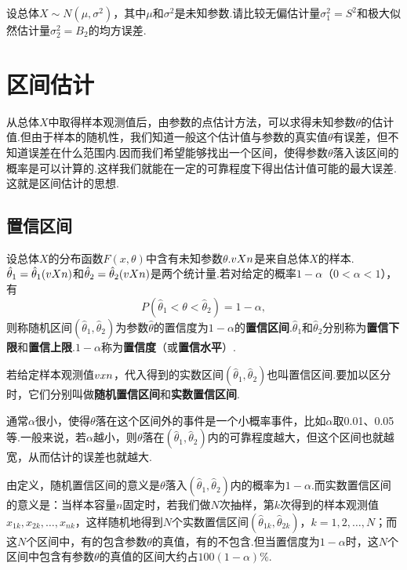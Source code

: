 \begin{example}
设总体\(X \sim N(\mu,\sigma^2)\)，其中\(\mu\)和\(\sigma^2\)是未知参数.请比较无偏估计量\(\sigma_1^2=S^2\)和极大似然估计量\(\sigma_2^2=B_2\)的均方误差.
\end{example}

\section{区间估计}
从总体\(X\)中取得样本观测值后，由参数的点估计方法，可以求得未知参数\(\theta\)的估计值.但由于样本的随机性，我们知道一般这个估计值与参数的真实值\(\theta\)有误差，但不知道误差在什么范围内.因而我们希望能够找出一个区间，使得参数\(\theta\)落入该区间的概率是可以计算的.这样我们就能在一定的可靠程度下得出估计值可能的最大误差.这就是区间估计的思想.

\subsection{置信区间}
\begin{definition}
设总体\(X\)的分布函数\(F(x,\theta)\)中含有未知参数\(\theta\).\(v{X}{n}\)是来自总体\(X\)的样本.\(\hat{\theta}_1=\hat{\theta}_1(v{X}{n})\)和\(\hat{\theta}_2=\hat{\theta}_2(v{X}{n})\)是两个统计量.若对给定的概率\(1-\alpha\)（\(0<\alpha<1\)），有\[
P(\hat{\theta}_1<\theta<\hat{\theta}_2)=1-\alpha,
\]则称随机区间\((\hat{\theta}_1,\hat{\theta}_2)\)为参数\(\hat{\theta}\)的置信度为\(1-\alpha\)的\textbf{置信区间}.\(\hat{\theta}_1\)和\(\hat{\theta}_2\)分别称为\textbf{置信下限}和\textbf{置信上限}.\(1-\alpha\)称为\textbf{置信度}（或\textbf{置信水平}）.

若给定样本观测值\(v{x}{n}\)，代入得到的实数区间\((\hat{\theta}_1,\hat{\theta}_2)\)也叫置信区间.要加以区分时，它们分别叫做\textbf{随机置信区间}和\textbf{实数置信区间}.
\end{definition}

通常\(\alpha\)很小，使得\(\theta\)落在这个区间外的事件是一个小概率事件，比如\(\alpha\)取0.01、0.05等.一般来说，若\(\alpha\)越小，则\(\theta\)落在\((\hat{\theta}_1,\hat{\theta}_2)\)内的可靠程度越大，但这个区间也就越宽，从而估计的误差也就越大.

由定义，随机置信区间的意义是\(\theta\)落入\((\hat{\theta}_1,\hat{\theta}_2)\)内的概率为\(1-\alpha\).而实数置信区间的意义是：当样本容量\(n\)固定时，若我们做\(N\)次抽样，第\(k\)次得到的样本观测值\(x_{1k},x_{2k},\dotsc,x_{nk}\)，这样随机地得到\(N\)个实数置信区间\((\hat{\theta}_{1k},\hat{\theta}_{2k})\)，\(k=1,2,\dots,N\)；而这\(N\)个区间中，有的包含参数\(\theta\)的真值，有的不包含.但当置信度为\(1-\alpha\)时，这\(N\)个区间中包含有参数\(\theta\)的真值的区间大约占\(100(1-\alpha)\%\).

